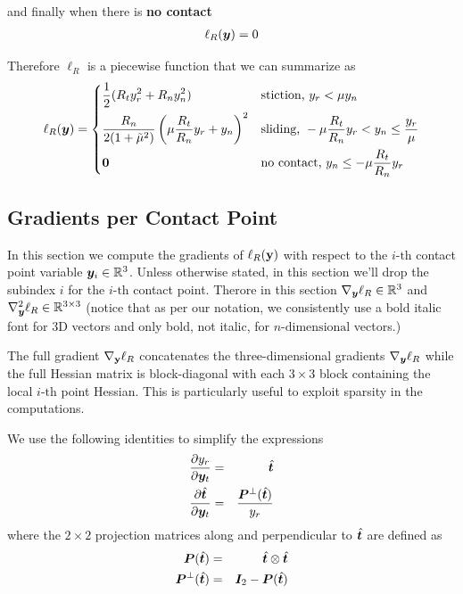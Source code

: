 and finally when there is \textbf{no contact}
\begin{eqnarray}
	\ell_R({\bm{y}}) = 0
\end{eqnarray}

Therefore $\ell_R$ is a piecewise function that we can summarize as
\begin{equation}
	\ell_R(\vf{y}) = 
\begin{dcases}
	\frac{1}{2}(R_t y_r^2+R_n y_n^2) & \text{stiction, } y_r < \mu y_n\\
	\frac{R_n}{2(1+\tilde\mu^2)}\left(\mu\frac{R_t}{R_n}y_r+y_n\right)^2 & \text{sliding, } -\mu \frac{R_t}{R_n} y_r < y_n \leq \frac{y_r}{\mu}\\
    \vf{0} & \text{no contact, } y_n \leq -\mu \frac{R_t}{R_n} y_r
\end{dcases}	  
	\label{eq:ell_R_piecewise}
\end{equation}

\subsection{Gradients per Contact Point}
In this section we compute the gradients of $\ell_R({\mathbf{y}})$ with respect to the
$i\text{-th}$ contact point variable ${\bm{y}}_i\in\mathbb{R}^3$. Unless otherwise
stated, in this section we'll drop the subindex $i$ for the $i\text{-th}$
contact point. Therore in this section $\nabla_{\bm{y}}\ell_R\in\mathbb{R}^3$ and
$\nabla_{\bm{y}}^2\ell_R\in\mathbb{R}^{3\times 3}$ (notice that as per our
notation, we consistently use a bold italic font for 3D vectors and only bold,
not italic, for $n\text{-dimensional}$ vectors.)

The full gradient $\nabla_{\mathbf{y}}\ell_R$ concatenates the three-dimensional
gradients $\nabla_{\bm{y}}\ell_R$ while the full Hessian matrix is block-diagonal
with each $3\times 3$ block containing the local $i\text{-th}$ point Hessian.
This is particularly useful to exploit sparsity in the computations.

We use the following identities to simplify the expressions
\begin{eqnarray}
	\frac{\partial y_r}{\partial\vf{y}_t} &=& \hat{\vf{t}}\nonumber\\
	\frac{\partial \hat{\vf{t}}}{\partial\vf{y}_t} &=&
	\frac{\vf{P}^\perp(\hat{\vf{t}})}{y_r}
	\label{eq:yt_derivatives}
\end{eqnarray}
where the $2\times 2$ projection matrices along and perpendicular to
$\hat{{\bm{t}}}$ are defined as
\begin{eqnarray}
	\vf{P}(\hat{\vf{t}}) &=& \hat{\vf{t}}\otimes\hat{\vf{t}}\nonumber\\
	\vf{P}^\perp(\hat{\vf{t}})&=&\vf{I}_2 - \vf{P}(\hat{\vf{t}})
	\label{eq:tangential_projections}
\end{eqnarray}

